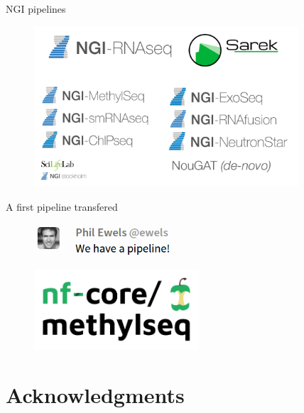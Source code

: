 \documentclass{beamer}
\begin{document}
\begin{frame}{NGI pipelines}
	\begin{figure}
		\includegraphics[height=6cm]{pictures/NGI-Pipelines.png}
	\end{figure}
\end{frame}

\begin{frame}{A first pipeline transfered}
	\begin{figure}
		\includegraphics[height=1.2cm]{pictures/weHaveAPipeline.png}
	\end{figure}
	\begin{figure}
		\includegraphics[height=3cm]{pictures/methylseq_logo}
	\end{figure}
\end{frame}

\section{Acknowledgments}
\end{document}
